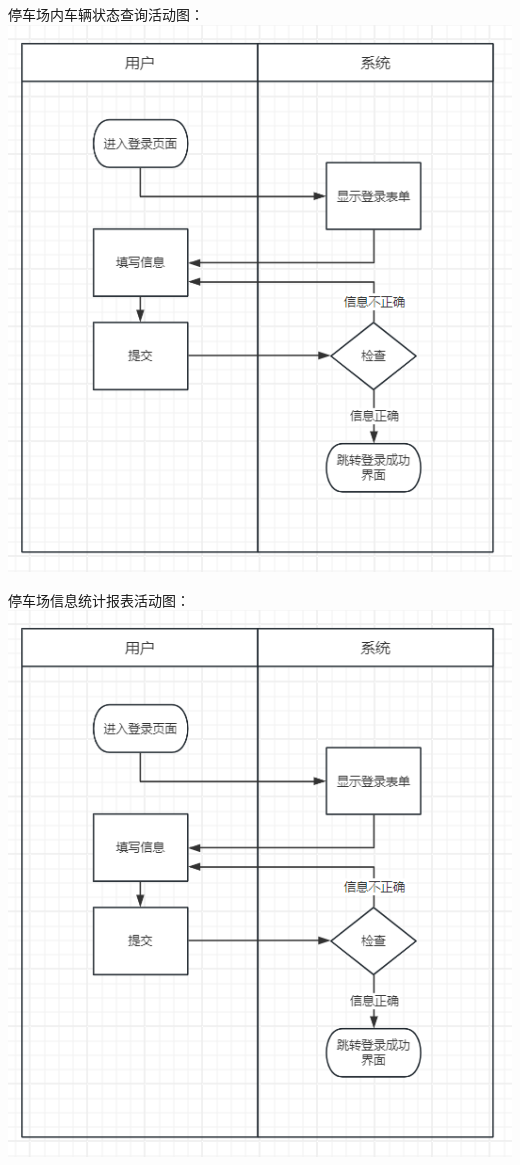 \documentclass[]{article}
\begin{document}
停车场内车辆状态查询活动图：
\includegraphics{media/media/image1.png}

停车场信息统计报表活动图：
\includegraphics{media/media/image1.png}
\end{document}
